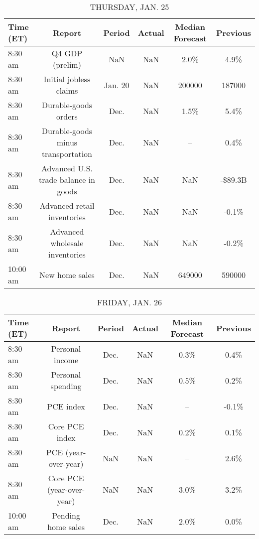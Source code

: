 \documentclass{article}%
\begin{document}
\begin{table}[htbp]%
\caption{THURSDAY, JAN. 25}%
\centering%
\begin{adjustbox}{width=1\textwidth}%
\begin{tabular}{lccccc}
\toprule
Time (ET) &                               Report &  Period & Actual & Median Forecast & Previous \\
\midrule
  8:30 am &                      Q4 GDP (prelim) &     NaN &    NaN &            2.0\% &     4.9\% \\
  8:30 am &               Initial jobless claims & Jan. 20 &    NaN &          200000 &   187000 \\
  8:30 am &                 Durable-goods orders &    Dec. &    NaN &            1.5\% &     5.4\% \\
  8:30 am &   Durable-goods minus transportation &    Dec. &    NaN &              -- &     0.4\% \\
  8:30 am & Advanced U.S. trade balance in goods &    Dec. &    NaN &             NaN &  -\$89.3B \\
  8:30 am &          Advanced retail inventories &    Dec. &    NaN &             NaN &    -0.1\% \\
  8:30 am &       Advanced wholesale inventories &    Dec. &    NaN &             NaN &    -0.2\% \\
 10:00 am &                       New home sales &    Dec. &    NaN &          649000 &   590000 \\
\bottomrule
\end{tabular}
%
\end{adjustbox}%
\end{table}

%


\begin{table}[htbp]%
\caption{FRIDAY, JAN. 26}%
\centering%
\begin{adjustbox}{width=1\textwidth}%
\begin{tabular}{lccccc}
\toprule
Time (ET) &                    Report & Period & Actual & Median Forecast & Previous \\
\midrule
  8:30 am &           Personal income &   Dec. &    NaN &            0.3\% &     0.4\% \\
  8:30 am &         Personal spending &   Dec. &    NaN &            0.5\% &     0.2\% \\
  8:30 am &                 PCE index &   Dec. &    NaN &              -- &    -0.1\% \\
  8:30 am &            Core PCE index &   Dec. &    NaN &            0.2\% &     0.1\% \\
  8:30 am &      PCE (year-over-year) &    NaN &    NaN &              -- &     2.6\% \\
  8:30 am & Core PCE (year-over-year) &    NaN &    NaN &            3.0\% &     3.2\% \\
 10:00 am &        Pending home sales &   Dec. &    NaN &            2.0\% &     0.0\% \\
\bottomrule
\end{tabular}
%
\end{adjustbox}%
\end{table}
\end{document}
